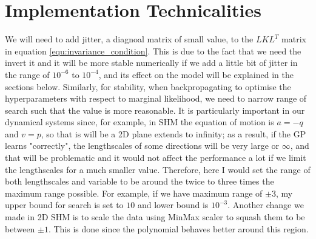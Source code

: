 \documentclass{statsmsc}
\begin{document}
\section{Implementation Technicalities}
We will need to add jitter, a diagnoal matrix of small value, to the $LKL^T$ matrix in equation \ref{equ:invariance_condition}.
This is due to the fact that we need the invert it and it will be more stable numerically if we add a little bit of jitter in the range of $10^{-6}$ to $10^{-4}$, and its effect on the model will be explained in the sections below.
Similarly, for stability, when backpropagating to optimise the hyperparameters with respect to marginal likelihood, we need to narrow range of search such that the value is more reasonable.
It is particularly important in our dynamical systems since, for example, in SHM the equation of motion is $a=-q$ and $v=p$, so that is will be a 2D plane extends to infinity;
as a result, if the GP learns "correctly", the lengthscales of some directions will be very large or $\infty$, and that will be problematic and it would not affect the performance a lot if we limit the lengthscales for a much smaller value.
Therefore, here I would set the range of both lengthscales and variable to be around the twice to three times the maximum range possible.
For example, if we have maximum range of $\pm 3$, my upper bound for search is set to $10$ and lower bound is $10^{-3}$.
Another change we made in 2D SHM is to scale the data using MinMax scaler to squash them to be between $\pm 1$. 
This is done since the polynomial behaves better around this region.
\end{document}
